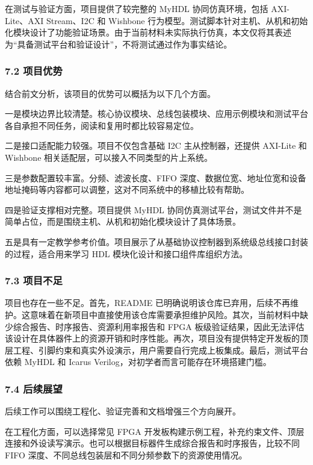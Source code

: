 在测试与验证方面，项目提供了较完整的 MyHDL 协同仿真环境，包括 AXI-Lite、AXI Stream、I2C 和 Wishbone 行为模型。测试脚本针对主机、从机和初始化模块设计了功能验证场景。由于当前材料未实际执行仿真，本文仅将其表述为``具备测试平台和验证设计''，不将测试通过作为事实结论。

\subsubsection{7.2 项目优势}\label{ux9879ux76eeux4f18ux52bf}

结合前文分析，该项目的优势可以概括为以下几个方面。

一是模块边界比较清楚。核心协议模块、总线包装模块、应用示例模块和测试平台各自承担不同任务，阅读和复用时都比较容易定位。

二是接口适配能力较强。项目不仅包含基础 I2C 主从控制器，还提供 AXI-Lite 和 Wishbone 相关适配层，可以接入不同类型的片上系统。

三是参数配置较丰富。分频、滤波长度、FIFO 深度、数据位宽、地址位宽和设备地址掩码等内容都可以调整，这对不同系统中的移植比较有帮助。

四是验证支撑相对完整。项目提供 MyHDL 协同仿真测试平台，测试文件并不是简单占位，而是围绕主机、从机和初始化模块设计了具体场景。

五是具有一定教学参考价值。项目展示了从基础协议控制器到系统级总线接口封装的过程，适合用来学习 HDL 模块化设计和接口组件库组织方法。

\subsubsection{7.3 项目不足}\label{ux9879ux76eeux4e0dux8db3}

项目也存在一些不足。首先，README 已明确说明该仓库已弃用，后续不再维护。这意味着在新项目中直接使用该仓库需要承担维护风险。其次，当前材料中缺少综合报告、时序报告、资源利用率报告和 FPGA 板级验证结果，因此无法评估该设计在具体器件上的资源开销和时序性能。再次，项目没有提供特定开发板的顶层工程、引脚约束和真实外设演示，用户需要自行完成上板集成。最后，测试平台依赖 MyHDL 和 Icarus Verilog，对初学者而言可能存在环境搭建门槛。

\subsubsection{7.4 后续展望}\label{ux540eux7eedux5c55ux671b}

后续工作可以围绕工程化、验证完善和文档增强三个方向展开。

在工程化方面，可以选择常见 FPGA 开发板构建示例工程，补充约束文件、顶层连接和外设读写演示。也可以根据目标器件生成综合报告和时序报告，比较不同 FIFO 深度、不同总线包装层和不同分频参数下的资源使用情况。

